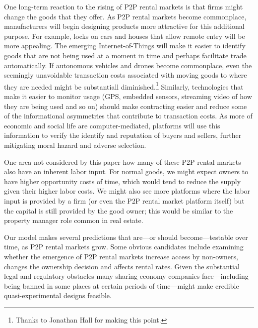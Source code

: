 \documentclass[11pt]{article}
\begin{document}
One long-term reaction to the rising of P2P rental markets is that firms might change the goods that they offer. 
As P2P rental markets become commonplace, manufacturers will begin designing products more attractive for this additional purpose. 
For example, locks on cars and houses that allow remote entry will be more appealing. 
The emerging Internet-of-Things will make it easier to identify goods that are not being used at a moment in time and perhaps facilitate trade automatically.
If autonomous vehicles and drones become commonplace, even the seemingly unavoidable transaction costs associated with moving goods to where they are needed might be substantiall diminished.\footnote{Thanks to Jonathan Hall for making this point.}
Similarly, technologies that make it easier to monitor usage (GPS, embedded sensors, streaming video of how they are being used and so on) should make contracting easier and reduce some of the informational asymmetries that contribute to transaction costs. 
As more of economic and social life are computer-mediated, platforms will use this information to verify the identify and reputation of buyers and sellers, further mitigating moral hazard and adverse selection.  

One area not considered by this paper how many of these P2P rental markets also have an inherent labor input. 
For normal goods, we might expect owners to have higher opportunity costs of time, which would tend to reduce the supply given their higher labor costs.
We might also see more platforms where the labor input is provided by a firm (or even the P2P rental market platform itself) but the capital is still provided by the good owner;
this would be similar to the property manager role common in real estate.

Our model makes several predictions that are---or should become---testable over time, as P2P rental markets grow.
Some obvious candidates include examining whether the emergence of P2P rental markets increase access by non-owners, changes the ownership decision and affects rental rates.
Given the substantial legal and regulatory obstacles many sharing economy companies face---including being banned in some places at certain periods of time---might make credible quasi-experimental designs feasible. 





\newpage 

\appendix 
\end{document}
